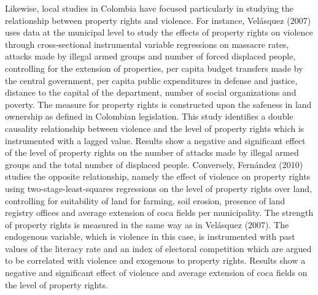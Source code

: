 \documentclass[a4paper, 12pt]{article}
\begin{document}
Likewise, local studies in Colombia have focused particularly in studying the relationship between property rights and violence. For instance, Vel\'{a}squez (2007) uses data at the municipal level to study the effects of property rights on violence through cross-sectional instrumental variable regressions on massacre rates, attacks made by illegal armed groups and number of forced displaced people, controlling for the extension of properties, per capita budget transfers made by the central government, per capita public expenditures in defense and justice, distance to the capital of the department, number of social organizations and poverty. The measure for property rights is constructed upon the safeness in land ownership as defined in Colombian legislation. This study identifies a double causality relationship between violence and the level of property rights which is instrumented with a lagged value. Results show a negative and significant effect of the level of property rights on the number of attacks made by illegal armed groups and the total number of displaced people. Conversely, Fern\'{a}ndez (2010) studies the opposite relationship, namely the effect of violence on property rights using two-stage-least-squares regressions on the level of property rights over land, controlling for suitability of land for farming, soil erosion, presence of land registry offices and average extension of coca fields per municipality. The strength of property rights is measured in the same way as in Vel\'{a}squez (2007). The endogenous variable, which is violence in this case, is instrumented with past values of the literacy rate and an index of electoral competition which are argued to be correlated with violence and exogenous to property rights. Results show a negative and significant effect of violence and average extension of coca fields on the level of property rights.
\end{document}
